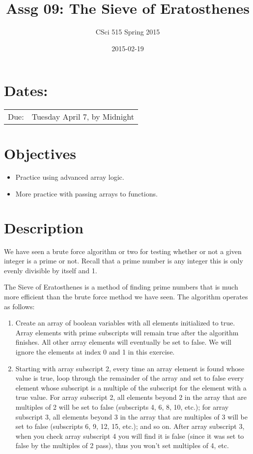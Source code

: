 \documentclass[11pt]{article}
\title{Assg 09: The Sieve of Eratosthenes}
\author{CSci 515 Spring 2015}
\date{2015-02-19}
\begin{document}
\maketitle


\section*{Dates:}
\label{sec-1}


\begin{center}
\begin{tabular}{ll}
 Due:  &  Tuesday April 7, by Midnight  \\
\end{tabular}
\end{center}
\section*{Objectives}
\label{sec-2}

\begin{itemize}
\item Practice using advanced array logic.
\item More practice with passing arrays to functions.
\end{itemize}
\section*{Description}
\label{sec-3}

We have seen a brute force algorithm or two for testing whether or not
a given integer is a prime or not.  Recall that a prime number is any
integer this is only evenly divisible by itself and 1.  

The Sieve of Eratosthenes is a method of finding prime numbers that
is much more efficient than the brute force method we have seen.
The algorithm operates as follows:

\begin{enumerate}
\item Create an array of boolean variables with all elements initialized
   to true.  Array elements with prime subscripts will remain true
   after the algorithm finishes.  All other array elements will
   eventually be set to false.  We will ignore the elements at index 0
   and 1 in this exercise.
\item Starting with array subscript 2, every time an array element is
   found whose value is true, loop through the remainder of the array
   and set to false every element whose subscript is a multiple of the
   subscript for the element with a true value.  For array subscript
   2, all elements beyond 2 in the array that are multiples of 2 will
   be set to false (subscripts 4, 6, 8, 10, etc.); for array subscript 
   3, all elements beyond 3 in the array that are multiples of 3 will be
   set to false (subscripts 6, 9, 12, 15, etc.); and so on.  After
   array subscript 3, when you check array subscript 4 you will find it
   is false (since it was set to false by the multiples of 2 pass), thus
   you won't set multiples of 4, etc.
\end{enumerate}
\end{document}
